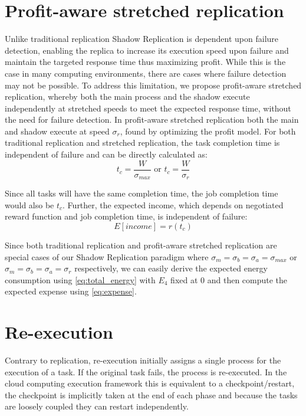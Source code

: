 \section{Profit-aware stretched replication} 
Unlike traditional replication
Shadow Replication is dependent upon failure detection, enabling the
replica to increase its execution speed upon failure and maintain the
targeted response time thus maximizing profit. While this is the case
in many computing environments, there are cases where failure
detection may not be possible. To address this limitation, we propose
profit-aware stretched replication, whereby both the main process and
the shadow execute independently at stretched speeds to meet the
expected response time, without the need for failure
detection. In profit-aware stretched replication both the main and
shadow execute at speed $\sigma_r$, found by optimizing the profit
model.  For both traditional replication and stretched replication,
the task completion time is independent of failure and can be directly
calculated as:
\begin{equation}
t_c=\frac{W}{\sigma_{max}} \text{ or } t_c=\frac{W}{\sigma_r}
\end{equation}


Since all tasks will have the same completion time, the job completion
time would also be $t_c$. Further, the expected income, which depends
on negotiated reward function and job completion time, is independent
of failure:
\begin{equation}
E[income]=r(t_c)
\end{equation}

Since both traditional replication and profit-aware stretched
replication are special cases of our Shadow Replication paradigm where
$\sigma_m=\sigma_b=\sigma_a=\sigma_{max}$ or
$\sigma_m=\sigma_b=\sigma_a=\sigma_r$ respectively, we can easily derive the
expected energy consumption using \ref{eq:total_energy} with $E_4$
fixed at 0 and then compute the expected expense using \ref{eq:expense}.

\section{Re-execution}

\noindent 
Contrary to replication, re-execution initially assigns a single
process for the execution of a task. If the original task fails, the
process is re-executed. In the cloud computing execution framework
this is equivalent to a checkpoint/restart, the checkpoint is
implicitly taken at the end of each phase and because the tasks are
loosely coupled they can restart independently. 

